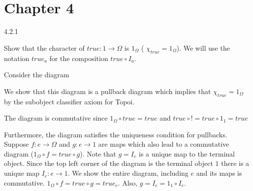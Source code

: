 \section*{Chapter 4}

\begin{solution}
4.2.1

Show that the character of $\textit{true}: 1 \rightarrow \Omega$ is $1_\Omega$
( $\chi_{true}=1_\Omega$). We will use the notation $\textit{true}_a$ for the composition $\textit{true} \circ I_a$.

Consider the diagram

\begin{center}
\end{center}

We show that this diagram is a pullback diagram which implies that $\chi_{true} = 1_\Omega$ by the subobject classifier axiom for Topoi.

The diagram is commutative since $1_\Omega \circ \textit{true} = \textit{true}$ and $\textit{true} \circ ! = \textit{true} \circ 1_1 = \textit{true}$

Furthermore, the diagram satisfies the uniqueness condition for pullbacks. Suppose $f: e \rightarrow \Omega$ and $g: e \rightarrow 1$ are maps which also lead to a commutative diagram ($1_\Omega \circ f = \textit{true} \circ g$). Note that $g = I_e$ is a unique map to the terminal object.
Since the top left corner of the diagram is the terminal object $1$ there is a unique map $I_e: e \rightarrow 1$. We show the entire diagram, including $e$ and its maps is commutative.
$1_\Omega \circ f = \textit{true} \circ g = \textit{true}_e$. Also, $g = I_e = 1_1 \circ I_e$.
\end{solution}
